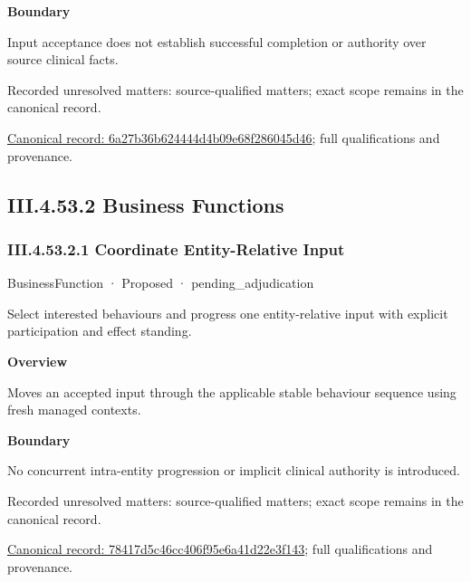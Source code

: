 \textbf{Boundary}



Input acceptance does not establish successful completion or authority over source clinical facts.


{\small Recorded unresolved matters: source-qualified matters; exact scope remains in the canonical record.}\par
{\footnotesize \href{../../../../continuum/business/business-service/6a27b36b624444d4b09e68f286045d46.md}{Canonical record: 6a27b36b624444d4b09e68f286045d46}; full qualifications and provenance.}\par
\subsection*{III.4.53.2 Business Functions}
\label{navigation:III.4.53.2}

\subsubsection*{III.4.53.2.1 Coordinate Entity-Relative Input}
\label{navigation:III.4.53.2.1}

\label{element:78417d5c46cc406f95e6a41d22e3f143}
{\small BusinessFunction · Proposed · pending\_adjudication}\par

Select interested behaviours and progress one entity-relative input with explicit participation and effect standing.



\textbf{Overview}



Moves an accepted input through the applicable stable behaviour sequence using fresh managed contexts.



\textbf{Boundary}



No concurrent intra-entity progression or implicit clinical authority is introduced.


{\small Recorded unresolved matters: source-qualified matters; exact scope remains in the canonical record.}\par
{\footnotesize \href{../../../../continuum/business/business-function/78417d5c46cc406f95e6a41d22e3f143.md}{Canonical record: 78417d5c46cc406f95e6a41d22e3f143}; full qualifications and provenance.}\par
